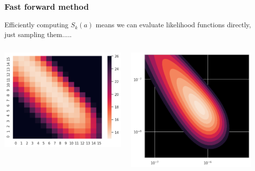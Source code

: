 \documentclass{beamer}
\begin{document}
\begin{frame}
    \frametitle{Fast forward method}
    Efficiently computing $S_k(a)$ means we can evaluate likelihood functions
    directly, just sampling them.....

    \begin{columns}
        \begin{column}{0.5\textwidth}
        \includegraphics[width=\textwidth]{figures/raster.png}
        \end{column}
        \begin{column}{0.5\textwidth}
        \includegraphics[width=\textwidth]{figures/contour.png}
        \end{column}
    \end{columns}

\end{frame}
\end{document}
